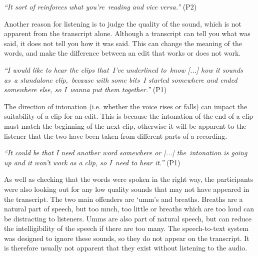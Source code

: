 \textit{``It sort of reinforces what you're reading and vice versa.''} (P2)




Another reason for listening is to judge the quality of the sound, which is not apparent from the transcript
alone. Although a transcript can tell you what was said, it does not tell you how it was said. This can change the
meaning of the words, and make the difference between an edit that works or does not work.

\textit{``I would like to hear the clips that I've underlined to know [...] how it sounds as a standalone clip, because
with some bits I started somewhere and ended somewhere else, so I wanna put them together.''} (P1)


The direction of intonation (i.e. whether the voice rises or falls) can impact the suitability of a clip for an
edit. This is because the intonation of the end of a clip must match the beginning of the next clip, otherwise it will
be apparent to the listener that the two have been taken from different parts of a recording.

\textit{``It could be that I need another word somewhere or [...] the intonation is going up and it won't work as a
clip, so I need to hear it.''} (P1)

As well as checking that the words were spoken in the right way, the participants were also looking out for any low
quality sounds that may not have appeared in the transcript. The two main offenders are `umm's and breaths.  Breaths
are a natural part of speech, but too much, too little or breaths which are too loud can be distracting to listeners.
Umms are also part of natural speech, but can reduce the intelligibility of the speech if there are too many.  The
speech-to-text system was designed to ignore these sounds, so they do not appear on the transcript.  It is therefore
usually not apparent that they exist without listening to the audio.

